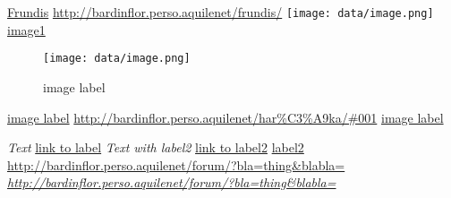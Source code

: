 \href{http://bardinflor.perso.aquilenet/frundis/}{Frundis}
\url{http://bardinflor.perso.aquilenet/frundis/}
\texttt{[image: data/image.png]}\hypertarget{label1}{}
\hyperlink{label1}{image1}

\begin{center}
\begin{figure}[htbp]
\texttt{[image: data/image.png]}
\caption{image label}
\label{fig:1}
\end{figure}
\end{center}
\hyperref[fig:1]{image label}
\url{http://bardinflor.perso.aquilenet/har\%C3\%A9ka/#001}
\hyperref[fig:1]{image label}

\hypertarget{label3}{}\emph{Text}
\hyperlink{label3}{link to label}
\hypertarget{label2}{}\emph{Text with label2}
\hyperlink{label2}{link to label2}
\hyperlink{label2}{label2}
\url{http://bardinflor.perso.aquilenet/forum/?bla=thing&blabla=}
\emph{\url{http://bardinflor.perso.aquilenet/forum/?bla=thing&blabla=}}

